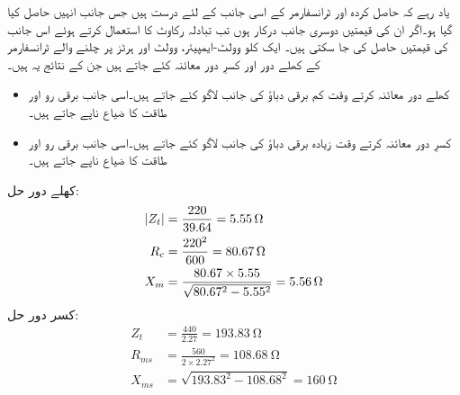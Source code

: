 یاد رہے کہ حاصل کردہ  اور  ٹرانسفارمر کے اسی جانب کے لئے درست ہیں جس جانب انہیں حاصل کیا گیا ہو۔اگر ان کی قیمتیں دوسری جانب درکار ہوں تب تبادلہ رکاوٹ کا استعمال کرتے ہوئے اس جانب کی قیمتیں حاصل کی جا سکتی ہیں۔ 
%
ایک   کلو وولٹ-ایمپیئر،  وولٹ اور  ہرٹز پر چلنے والے ٹرانسفارمر کے کھلے دور اور کسرِ دور معائنہ کئے جاتے ہیں جن کے نتائج یہ ہیں۔
\begin{itemize}
\item
کھلے دور معائنہ کرتے وقت کم برقی دباؤ کی جانب   لاگو کئے جاتے ہیں۔اسی جانب برقی رو  اور طاقت کا ضیاع  ناپے جاتے ہیں۔
\item
کسرِ دور معائنہ کرتے وقت زیادہ برقی دباؤ کی جانب   لاگو کئے جاتے ہیں۔اسی جانب برقی رو  اور طاقت کا ضیاع  ناپے جاتے ہیں۔
\end{itemize}

کھلے دور حل:
\begin{align*}
\abs{Z_t}&=\frac{220}{39.64}=\SI{5.55}{\ohm}\\
R_c&=\frac{220^2}{600}=\SI{80.67}{\ohm}\\
X_m&=\frac{80.67 \times 5.55}{\sqrt{80.67^2-5.55^2}}=\SI{5.56}{\ohm}
\end{align*}
کسر دور حل:
\begin{align*}
Z_t&=\frac{440}{2.27}=\SI{193.83}{\ohm}\\
R_{ms}&=\frac{560}{2 \times 2.27^2}=\SI{108.68}{\ohm}\\
X_{ms}&=\sqrt{193.83^2-108.68^2}=\SI{160}{\ohm}
\end{align*}

